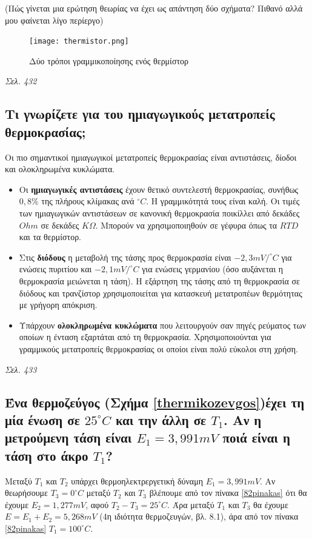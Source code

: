 \documentclass{article}
\begin{document}
(Πώς γίνεται μια ερώτηση θεωρίας να έχει ως απάντηση δύο σχήματα? Πιθανό αλλά μου φαίνεται λίγο περίεργο)

\begin{figure}[h!]
    \texttt{[image: thermistor.png]}
    \caption{Δύο τρόποι γραμμικοποίησης ενός θερμίστορ}
    \label{thermistor}
\end{figure}

\emph{Σελ. 432}

\subsection{Τι γνωρίζετε για του ημιαγωγικούς μετατροπείς θερμοκρασίας;}
Οι πιο σημαντικοί ημιαγωγικοί μετατροπείς θερμοκρασίας είναι αντιστάσεις, δίοδοι και ολοκληρωμένα κυκλώματα.

\begin{itemize}
    \item Οι \textbf{ημιαγωγικές αντιστάσεις} έχουν θετικό συντελεστή θερμοκρασίας, συνήθως $0,8\%$ της πλήρους κλίμακας ανά $^{\circ}C$. Η γραμμικότητά τους είναι καλή.
        Οι τιμές των ημιαγωγικών αντιστάσεων σε κανονική θερμοκρασία ποικίλλει από δεκάδες $Ohm$ σε δεκάδες $K\Omega$. Μπορούν να χρησιμοποιηθούν σε γέφυρα όπως τα
        $RTD$ και τα θερμίστορ.
    \item Στις \textbf{διόδους} η μεταβολή της τάσης προς θερμοκρασία είναι $-2,3mV/^{\circ}C$ για ενώσεις πυριτίου και $-2,1mV/^{\circ}C$ για ενώσεις γερμανίου (όσο 
        αυξάνεται η θερμοκρασία μειώνεται η τάση). Η εξάρτηση της τάσης από τη θερμοκρασία σε διόδους και τρανζίστορ χρησιμοποιείται για κατασκευή μετατροπέων θερμότητας
        με γρήγορη απόκριση.
    \item Υπάρχουν \textbf{ολοκληρωμένα κυκλώματα} που λειτουργούν σαν πηγές ρεύματος των οποίων η ένταση εξαρτάται από τη θερμοκρασία. Χρησιμοποιούνται για γραμμικούς
        μετατροπείς θερμοκρασίας οι οποίοι είναι πολύ εύκολοι στη χρήση.
\end{itemize}

\emph{Σελ. 433}

\subsection{Ένα θερμοζεύγος (Σχήμα \ref{thermikozevgos})έχει τη μία ένωση σε $25^{\circ} C$ και την άλλη σε $T_1$. Αν η μετρούμενη τάση είναι $E_1=3,991mV$ 
ποιά είναι η τάση στο άκρο $T_1$?}
Μεταξύ $T_1$ και $T_2$ υπάρχει θερμοηλεκτρεργετική δύναμη $E_1 = 3,991 mV$. Αν θεωρήσουμε $T_3 = 0^{\circ}C$ μεταξύ $T_2$ και $T_3$ βλέπουμε από τον πίνακα 
\ref{82pinakas} ότι θα έχουμε $E_2 = 1,277mV$, αφού $T_2 - T_3 = 25^{\circ}C$. Άρα μεταξύ $T_1$ και $T_3$ θα έχουμε $E = E_1 + E_2 = 5,268mV$ (4η ιδιότητα 
θερμοζευγών, βλ. 8.1), άρα από τον πίνακα \ref{82pinakas} $T_1 = 100^{\circ}C$.
\end{document}
